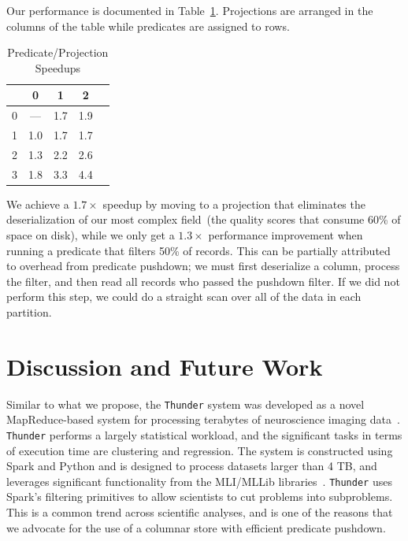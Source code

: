 \documentclass{acm_proc_article-sp}
\begin{document}
Our performance is documented in Table~\ref{tab:ppp}. Projections are arranged in the columns of the table
while predicates are assigned to rows.

\begin{table}[h]
\caption{Predicate/Projection Speedups}
\label{tab:ppp}
\begin{center}
\begin{tabular}{ l | c c c c }
\hline
& 0 & 1 & 2 \\
\hline
\hline
0 & --- & 1.7 & 1.9 \\
1 & 1.0 & 1.7 & 1.7 \\
2 & 1.3 & 2.2 & 2.6 \\
3 & 1.8 & 3.3 & 4.4 \\
\hline
\end{tabular}
\end{center}
\end{table}

We achieve a $1.7\times$ speedup by moving to a projection that eliminates the deserialization of our most
complex field~(the quality scores that consume 60\% of space on disk), while we only get a $1.3\times$
performance improvement when running a predicate that filters 50\% of records. This can be partially attributed
to overhead from predicate pushdown; we must first deserialize a column, process the filter, and then read all
records who passed the pushdown filter. If we did not perform this step, we could do a straight scan over all of
the data in each partition.

\section{Discussion and Future Work}
\label{sec:discussion-future-work}

Similar to what we propose, the \texttt{Thunder} system was developed as a novel MapReduce-based system for
processing terabytes of neuroscience imaging data~\cite{freeman14}. \texttt{Thunder} performs a largely statistical
workload, and the significant tasks in terms of execution time are clustering and regression. The system is
constructed using Spark and Python and is designed to process datasets larger than 4 TB, and leverages
significant functionality from the MLI/MLLib libraries~\cite{sparks13}. \texttt{Thunder} uses Spark's
filtering primitives to allow scientists to cut problems into subproblems. This is a common trend across scientific
analyses, and is one of the reasons that we advocate for the use of a columnar store with efficient predicate
pushdown.
\end{document}
